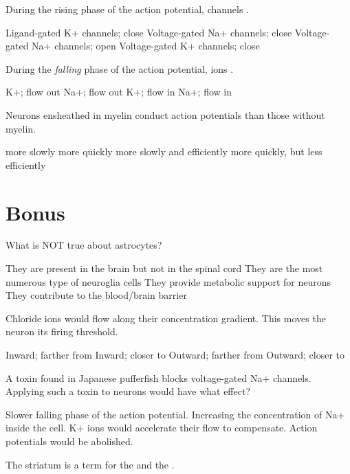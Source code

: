 \documentclass[answers]{exam}
\begin{document}
\begin{questions}
\question During the rising phase of the action potential, \fillin channels \fillin.
\begin{choices}
\choice Ligand-gated K+ channels; close
\choice Voltage-gated Na+ channels; close
\correctchoice Voltage-gated Na+ channels; open
\choice Voltage-gated K+ channels; close
\end{choices}

\question During the \emph{falling} phase of the action potential, \fillin ions \fillin.
\begin{choices}
\correctchoice K+; flow out
\choice Na+; flow out
\choice K+; flow in
\choice Na+; flow in
\end{choices}

\question Neurons ensheathed in myelin conduct action potentials \fillin than those without myelin.
\begin{choices}
\choice more slowly
\correctchoice more quickly
\choice more slowly and efficiently
\choice more quickly, but less efficiently
\end{choices}

\section{Bonus}

\question What is NOT true about astrocytes?
\begin{choices}
\correctchoice They are present in the brain but not in the spinal cord
\choice They are the most numerous type of neuroglia cells
\choice They provide metabolic support for neurons
\choice They contribute to the blood/brain barrier
\end{choices}

\question Chloride ions would flow \fillin along their concentration gradient. This moves the neuron \fillin its firing threshold.
\begin{choices}
\correctchoice Inward; farther from
\choice Inward; closer to
\choice Outward; farther from
\choice Outward; closer to
\end{choices}

\newpage

\question A toxin found in Japanese pufferfish blocks voltage-gated Na+ channels. Applying such a toxin to neurons would have what effect?
\begin{choices}
\choice Slower falling phase of the action potential.
\choice Increasing the concentration of Na+ inside the cell.
\choice K+ ions would accelerate their flow to compensate.
\correctchoice Action potentials would be abolished.
\end{choices}

\question The striatum is a term for the \fillin and the \fillin.
\begin{choices}
\end{choices} 

\end{questions}
\end{document}
